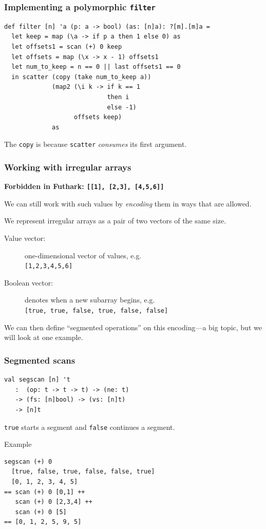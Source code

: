 \begin{frame}[fragile]
  \frametitle{Implementing a polymorphic \texttt{filter}}

\begin{lstlisting}
def filter [n] 'a (p: a -> bool) (as: [n]a): ?[m].[m]a =
  let keep = map (\a -> if p a then 1 else 0) as
  let offsets1 = scan (+) 0 keep
  let offsets = map (\x -> x - 1) offsets1
  let num_to_keep = n == 0 || last offsets1 == 0
  in scatter (copy (take num_to_keep a))
             (map2 (\i k -> if k == 1
                            then i
                            else -1)
                   offsets keep)
             as
\end{lstlisting}

  The \texttt{copy} is because \texttt{scatter} \emph{consumes} its first argument.

\end{frame}

\begin{frame}[fragile]
  \frametitle{Working with irregular arrays}

  \begin{center}
    \textbf{Forbidden in Futhark: \texttt{[[1], [2,3], [4,5,6]]}}
  \end{center}

  We can still work with such values by \emph{encoding} them in ways that are
  allowed.\pause

  We represent irregular arrays as a pair of two vectors of the same size.
  \begin{description}
  \item[Value vector:] one-dimensional vector of values, e.g.\hfill\\
    \texttt{[1,2,3,4,5,6]}
    \item[Boolean vector:] denotes when a new subarray begins, e.g.\hfill\\
      \texttt{[true, true, false, true, false, false]}
  \end{description}

  We can then define ``segmented operations'' on this encoding---a big topic,
  but we will look at one example.

\end{frame}

\begin{frame}[fragile]
  \frametitle{Segmented scans}
\begin{lstlisting}
val segscan [n] 't
   :  (op: t -> t -> t) -> (ne: t)
   -> (fs: [n]bool) -> (vs: [n]t)
   -> [n]t
\end{lstlisting}

\texttt{true} starts a segment and \texttt{false} continues a segment.

\begin{block}{Example}

\begin{lstlisting}
segscan (+) 0
  [true, false, true, false, false, true]
  [0, 1, 2, 3, 4, 5]
== scan (+) 0 [0,1] ++
   scan (+) 0 [2,3,4] ++
   scan (+) 0 [5]
== [0, 1, 2, 5, 9, 5]
\end{lstlisting}
\end{block}

\end{frame}

